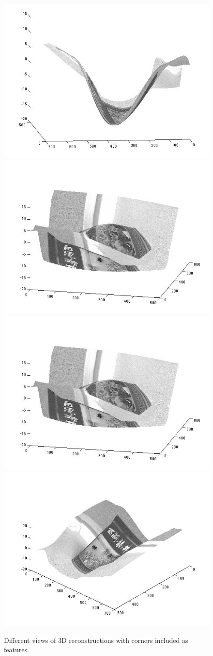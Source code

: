 \begin{figure}[H]
\begin{center}
\includegraphics[width=0.45\linewidth]{figures/pic1.jpg}
\includegraphics[width=0.45\linewidth]{figures/pic2.jpg}
\includegraphics[width=0.45\linewidth]{figures/pic3.jpg}
\includegraphics[width=0.45\linewidth]{figures/pic4.jpg}
\end{center}
\caption{Different views of 3D reconstructions with corners included as features.}
\label{zhang_reconstructed}
\end{figure}